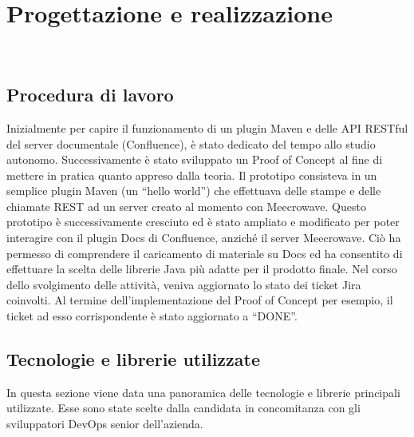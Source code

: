 
\chapter{Progettazione e realizzazione}
\label{cap:progettazione}

\\

\section{Procedura di lavoro}
Inizialmente per capire il funzionamento di un plugin Maven e delle API RESTful del server documentale (Confluence), è stato dedicato del tempo allo studio autonomo.
Successivamente è stato sviluppato un Proof of Concept al fine di mettere in pratica quanto appreso dalla teoria.
Il prototipo consisteva in un semplice plugin Maven (un ``hello world'') che effettuava delle stampe e delle chiamate REST ad un server creato al momento con Meecrowave.
Questo prototipo è successivamente cresciuto ed è stato ampliato e modificato per poter interagire con il plugin Docs di Confluence, anziché il server Meecrowave.
Ciò ha permesso di comprendere il caricamento di materiale su Docs ed ha consentito di effettuare la scelta delle librerie Java più adatte per il prodotto finale.
Nel corso dello svolgimento delle attività, veniva aggiornato lo stato dei ticket Jira coinvolti.
Al termine dell'implementazione del Proof of Concept per esempio, il ticket ad esso corrispondente è stato aggiornato a ``DONE''.

\section{Tecnologie e librerie utilizzate}
\label{sec:tecnologie-strumenti}

In questa sezione viene data una panoramica delle tecnologie e librerie principali utilizzate.
Esse sono state scelte dalla candidata in concomitanza con gli sviluppatori DevOps senior dell'azienda.



